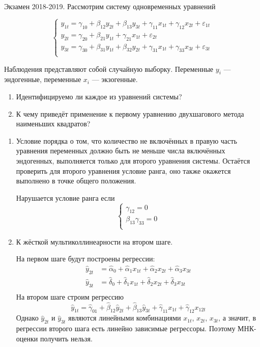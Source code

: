 \begin{problem} 
Экзамен 2018-2019. Рассмотрим систему одновременных уравнений

\[
    \begin{cases}
    y_{1t} = \gamma_{10} + \beta_{12} y_{2t} + \beta_{13} y_{3t} + \gamma_{11} x_{1t} + \gamma_{12} x_{2t} + \varepsilon_{1t} \\
    y_{2t} = \gamma_{20} + \beta_{21} y_{1t} + \gamma_{21} x_{1t} + \varepsilon_{2t} \\
    y_{3t} = \gamma_{30} + \beta_{31} y_{1t} + \beta_{32} y_{2t} + \gamma_{31} x_{1t} + \gamma_{33} x_{3t} + \varepsilon_{3t} \\
    \end{cases}
\]

Наблюдения представляют собой случайную выборку. Переменные $y_i$ — эндогенные, переменные $x_i$ — экзогенные.

\begin{enumerate}
    \item Идентифицируемо ли каждое из уравнений системы?
    \item К чему приведёт применение к первому уравнению двухшагового метода наименьших квадратов?
\end{enumerate}
  

\begin{sol}
\begin{enumerate}
\item Условие порядка о том, что количество не включённых в правую часть
уравнения переменных должно быть не меньше числа включённых эндогенных, выполняется только
для второго уравнения системы.
Остаётся проверить для второго уравнения условие ранга,
оно также окажется выполнено в точке общего положения.

Нарушается условие ранга если
\[
\begin{cases}
  \gamma_{12} = 0 \\
  \beta_{13} \gamma_{33} = 0 \\
\end{cases}  
\]
\item К жёсткой мультиколлинеарности на втором шаге.

На первом шаге будут построены регрессии:
\begin{align*}
\hat{y}_{2t} &= \hat{\alpha}_{0} + \hat{\alpha}_1 x_{1t} + \hat{\alpha}_2 x_{2t} + \hat{\alpha}_3 x_{3t} \\
\hat{y}_{3t} &= \hat{\delta}_{0} + \hat{\delta}_1 x_{1t} + \hat{\delta}_2 x_{2t} + \hat{\delta}_3 x_{3t} \\
\end{align*}
На втором шаге строим регрессию
\[
\hat{y}_{1t} = \hat{\gamma}_{01} + \hat{\beta}_{12} \hat{y}_{2t} + \hat{\beta}_{13} \hat{y}_{3t} + \hat{\gamma}_{11} x_{1t} + \hat{\gamma}_{12} x_{12t}
\]
Однако $\hat{y}_{2t}$ и $\hat{y}_{3t}$ являются линейными комбинациями $x_{1t}$,
$x_{2t}$, $x_{3t}$, а значит, в регрессии второго шага есть линейно зависимые регрессоры.
Поэтому МНК-оценки получить нельзя.
\end{enumerate}    
\end{sol}
\end{problem}

